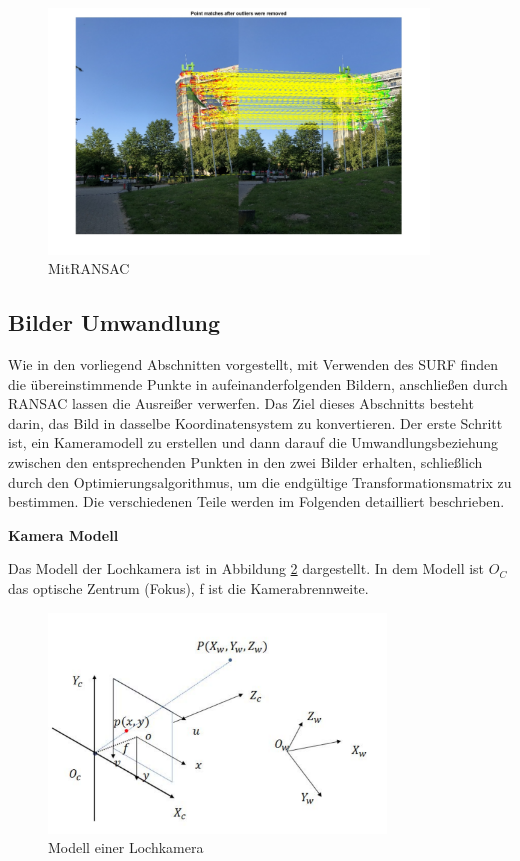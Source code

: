 \begin{figure}[H]
 \centering 
 \includegraphics[keepaspectratio,width=0.9\textwidth]{images/3_Ersteverfahren/RANSAC/MitRANSAC.pdf}
 \caption{MitRANSAC}
 \label{fig:MitRANSAC}
\end{figure} 


\subsection{Bilder Umwandlung}

Wie in den vorliegend Abschnitten vorgestellt, mit Verwenden des SURF finden die übereinstimmende Punkte in aufeinanderfolgenden Bildern, anschließen durch RANSAC lassen die Ausreißer verwerfen. Das Ziel dieses Abschnitts besteht darin, das Bild in dasselbe Koordinatensystem zu konvertieren. Der erste Schritt ist, ein Kameramodell zu erstellen und dann darauf die Umwandlungsbeziehung zwischen den entsprechenden Punkten in den zwei Bilder erhalten, schließlich durch den Optimierungsalgorithmus, um die endgültige Transformationsmatrix zu bestimmen. Die verschiedenen Teile werden im Folgenden detailliert beschrieben.

\textbf{Kamera Modell}

Das Modell der Lochkamera ist in Abbildung \ref{fig:cameramodel} dargestellt. In dem Modell ist $O_C$ das optische Zentrum (Fokus), f ist die Kamerabrennweite.

\begin{figure}[htb]
 \centering 
 \includegraphics[keepaspectratio,width=0.8\textwidth]{images/3_Ersteverfahren/Kamera/cameramodel.pdf}
 \caption{Modell einer Lochkamera}
 \label{fig:cameramodel}
\end{figure} 

